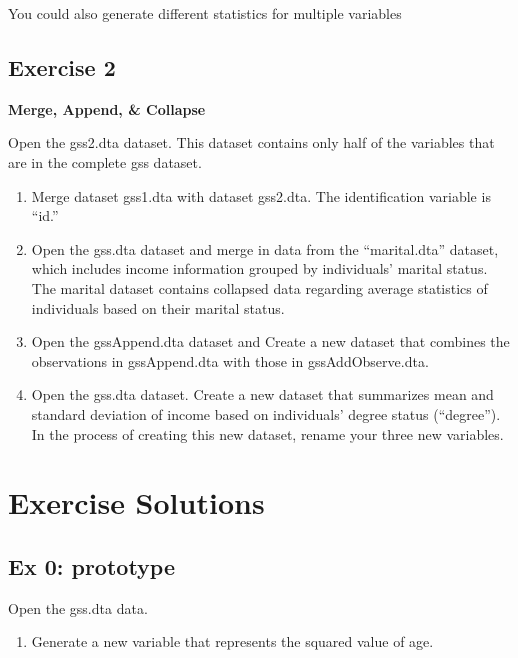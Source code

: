 \documentclass[]{book}
\providecommand{\tightlist}{%
  \setlength{\itemsep}{0pt}\setlength{\parskip}{0pt}}
\begin{document}
You could also generate different statistics for multiple variables

\hypertarget{exercise-2-5}{%
\subsection{Exercise 2}\label{exercise-2-5}}

\textbf{Merge, Append, \& Collapse}

Open the gss2.dta dataset. This dataset contains only half of the variables that are in the complete gss dataset.

\begin{enumerate}
\def\labelenumi{\arabic{enumi}.}
\tightlist
\item
  Merge dataset gss1.dta with dataset gss2.dta. The identification variable is ``id.''
\item
  Open the gss.dta dataset and merge in data from the ``marital.dta'' dataset, which includes income information grouped by individuals' marital status. The marital dataset contains collapsed data regarding average statistics of individuals based on their marital status.
\item
  Open the gssAppend.dta dataset and Create a new dataset that combines the observations in gssAppend.dta with those in gssAddObserve.dta.
\item
  Open the gss.dta dataset. Create a new dataset that summarizes mean and standard deviation of income based on individuals' degree status (``degree''). In the process of creating this new dataset, rename your three new variables.
\end{enumerate}

\hypertarget{exercise-solutions-1}{%
\section{Exercise Solutions}\label{exercise-solutions-1}}

\hypertarget{ex-0-prototype-1}{%
\subsection{Ex 0: prototype}\label{ex-0-prototype-1}}

Open the gss.dta data.

\begin{enumerate}
\def\labelenumi{\arabic{enumi}.}
\tightlist
\item
  Generate a new variable that represents the squared value of age.
\end{enumerate}
\end{document}
